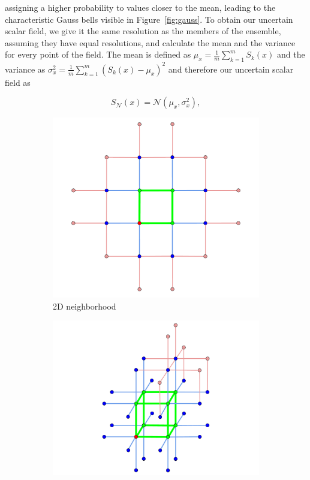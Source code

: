 \noindent assigning a higher probability to values closer to the mean,
leading to the characteristic Gauss bells visible in
Figure~\ref{fig:gauss}. To obtain our uncertain scalar field, we give it
the same resolution as the members of the ensemble, assuming they have
equal resolutions, and calculate the mean and the variance for every
point of the field. The mean is defined as $\mu_x = \frac{1}{m}
\sum_{k=1}^m S_k(x)$ and the variance as $\sigma_x^2 = \frac{1}{m}
\sum_{k=1}^m {(S_k(x)-\mu_x)}^2$ and therefore our uncertain scalar field
as

\begin{equation}
  S_{\mathcal{N}}(x) = \mathcal{N}(\mu_{x}, \sigma_{x}^2),
\end{equation}

\begin{figure}[ht]
  \centering
  \begin{subfigure}[b]{0.4\textwidth}
    \includegraphics[width=\textwidth]{Images/2DNH.pdf}
    \caption{2D neighborhood}
    \label{fig:2DNH}
  \end{subfigure}
  \begin{subfigure}[b]{0.49\textwidth}
    \includegraphics[width=\textwidth]{Images/3DNH.pdf}

\end{subfigure}
\end{figure}
